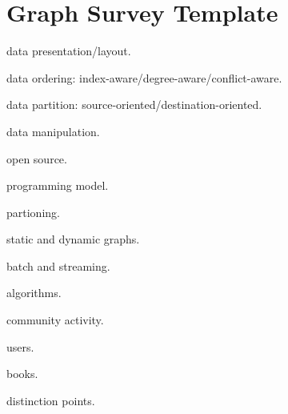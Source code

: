 \documentclass[UTF8,12pt,a4paper]{article}
\begin{document}
\section{Graph Survey Template}
\begin{compactitem}
  \item data presentation/layout.
  \item data ordering: index-aware/degree-aware/conflict-aware.
  \item data partition: source-oriented/destination-oriented.
  \item data manipulation.
  \item open source.
  \item programming model.
  \item partioning.
  \item static and dynamic graphs.
  \item batch and streaming.
  \item algorithms.
  \item community activity.
  \item users.
  \item books.
  \item distinction points.
\end{compactitem}
\clearpage



\newpage
\end{document}
